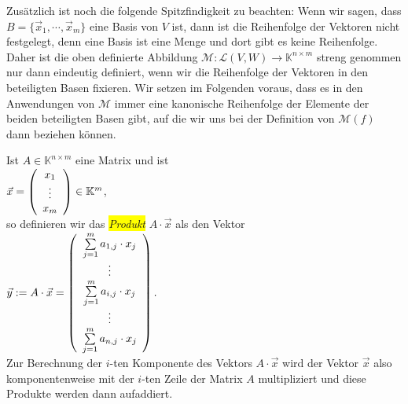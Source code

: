 Zus\"{a}tzlich ist noch die folgende Spitzfindigkeit zu beachten:  Wenn wir sagen, dass 
$B = \{\vec{x}_1, \cdots, \vec{x}_m \}$ eine Basis von $V$ ist, dann ist die Reihenfolge der
Vektoren nicht festgelegt, denn eine Basis ist eine Menge und dort gibt es keine
Reihenfolge.  Daher ist die oben definierte Abbildung $\mathcal{M}: \mathcal{L}(V,W) \rightarrow\mathbb{K}^{n \times m}$ 
streng genommen nur dann eindeutig definiert, wenn wir die Reihenfolge der Vektoren in den
beteiligten Basen fixieren. 
Wir setzen im Folgenden voraus, dass es in den Anwendungen von $\mathcal{M}$ immer eine kanonische
Reihenfolge der Elemente der beiden beteiligten Basen gibt, auf die wir uns bei der Definition von
$\mathcal{M}(f)$ dann beziehen k\"{o}nnen.
\eox


 Ist $A \in \mathbb{K}^{n \times m}$ eine Matrix und ist 
\\[0.5cm]
\hspace*{1.3cm}
$\vec{x} = \left(
      \begin{array}[c]{c}
      x_{1}  \\
      \vdots \\
      x_{m}  \\
      \end{array}
    \right) \in \mathbb{K}^m
$,
\\[0.5cm]
so definieren wir das \colorbox{yellow}{\emph{Produkt}} $A \cdot \vec{x}$ als den Vektor
\\[0.5cm]
\hspace*{1.3cm}
$\vec{y} := A \cdot \vec{x} = \left(
      \begin{array}[c]{c}
      \sum\limits_{j=1}^m a_{1,j} \cdot x_{j}  \\
      \vdots \\
      \sum\limits_{j=1}^m a_{i,j} \cdot x_{j}  \\
      \vdots \\
      \sum\limits_{j=1}^m a_{n,j} \cdot x_{j}  \\
      \end{array}
      \right). 
$
\\[0.5cm]
Zur Berechnung der $i$-ten Komponente des Vektors $A \cdot \vec{x}$ wird der Vektor $\vec{x}$
also komponentenweise mit der $i$-ten Zeile der Matrix $A$ multipliziert und diese Produkte werden
dann aufaddiert.

